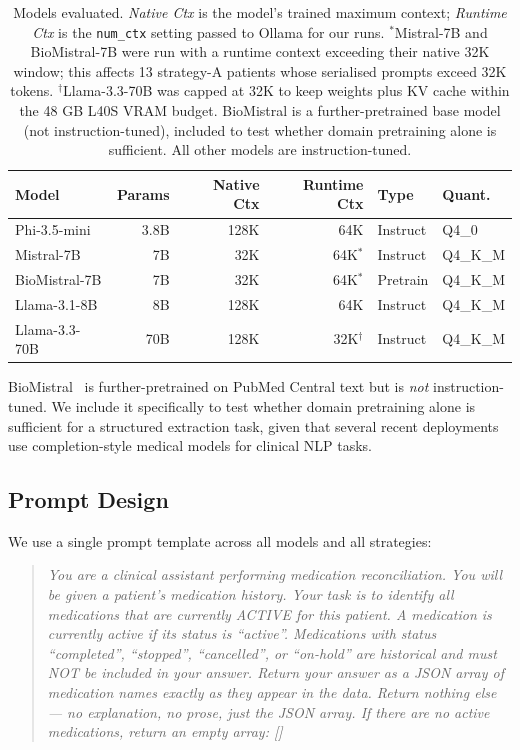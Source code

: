 \begin{table}[t]
\centering
\small
\renewcommand{\arraystretch}{1.25}
\begin{tabular}{lrrrll}
\toprule
\textbf{Model} & \textbf{Params} & \textbf{Native Ctx} & \textbf{Runtime Ctx} & \textbf{Type} & \textbf{Quant.} \\
\midrule
Phi-3.5-mini   & 3.8B  & 128K & 64K          & Instruct & Q4\_0   \\
Mistral-7B     & 7B    & 32K  & 64K$^{*}$    & Instruct & Q4\_K\_M \\
BioMistral-7B  & 7B    & 32K  & 64K$^{*}$    & Pretrain & Q4\_K\_M \\
Llama-3.1-8B   & 8B    & 128K & 64K          & Instruct & Q4\_K\_M \\
Llama-3.3-70B  & 70B   & 128K & 32K$^{\dag}$ & Instruct & Q4\_K\_M \\
\bottomrule
\end{tabular}
\caption{Models evaluated. \textit{Native Ctx} is the model's trained maximum context;
  \textit{Runtime Ctx} is the \texttt{num\_ctx} setting passed to Ollama for our runs.
  $^{*}$Mistral-7B and BioMistral-7B were run with a runtime context exceeding their
  native 32K window; this affects 13 strategy-A patients whose serialised prompts
  exceed 32K tokens. $^{\dag}$Llama-3.3-70B was capped at 32K to keep weights plus KV
  cache within the 48 GB L40S VRAM budget. BioMistral is a further-pretrained base
  model (not instruction-tuned), included to test whether domain pretraining alone is
  sufficient. All other models are instruction-tuned.}
\label{tab:models}
\end{table}

BioMistral~\cite{labrak2024biomistral} is further-pretrained on PubMed Central text but
is \textit{not} instruction-tuned. We include it specifically to test whether domain
pretraining alone is sufficient for a structured extraction task, given that several
recent deployments use completion-style medical models for clinical NLP tasks.

\subsection{Prompt Design}
\label{sec:prompt}

We use a single prompt template across all models and all strategies:

\begin{quote}
\small
\textit{You are a clinical assistant performing medication reconciliation.
You will be given a patient's medication history. Your task is to identify all
medications that are currently ACTIVE for this patient.
A medication is currently active if its status is ``active''. Medications with
status ``completed'', ``stopped'', ``cancelled'', or ``on-hold'' are historical
and must NOT be included in your answer.
Return your answer as a JSON array of medication names exactly as they appear
in the data. Return nothing else — no explanation, no prose, just the JSON array.
If there are no active medications, return an empty array: []}
\end{quote}

